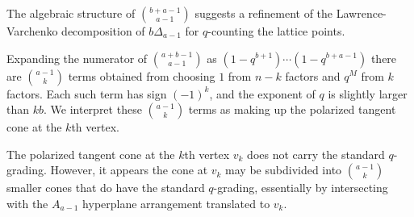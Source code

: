 \documentclass{amsart}[12pt]
\theoremstyle{definition}
\begin{document}
\subsubsection{}

The algebraic structure of $\binom{b+a-1}{a-1}$ suggests  a refinement of the Lawrence-Varchenko decomposition of $b\Delta_{a-1}$ for $q$-counting the lattice points.

Expanding the numerator of $\binom{a+b-1}{a-1}$ as $(1-q^{b+1})\cdots (1-q^{b+a-1})$ there are $\binom{a-1}{k}$ terms obtained from choosing $1$ from $n-k$ factors and $q^M$ from $k$ factors. Each such term has sign $(-1)^k$, and the exponent of $q$ is slightly larger than $kb$.  We interpret these $\binom{a-1}{k}$ terms as making up the polarized tangent cone at the $k$th vertex.


The polarized tangent cone at the $k$th vertex $v_k$ does not carry the standard $q$-grading.  However, it appears the cone at $v_k$ may be subdivided into $\binom{a-1}{k}$ smaller cones that do have the standard $q$-grading, essentially by intersecting with the $A_{a-1}$ hyperplane arrangement translated to $v_k$.
\end{document}
